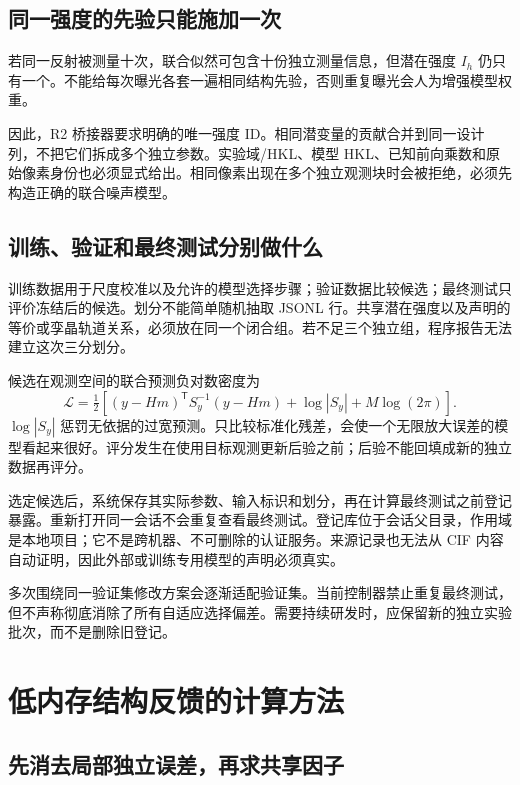 \documentclass[UTF8,11pt,a4paper,fontset=fandol]{ctexart}
\newcommand{\T}{^{\mathsf T}}
\begin{document}
\subsection{同一强度的先验只能施加一次}

若同一反射被测量十次，联合似然可包含十份独立测量信息，但潜在强度 $I_h$ 仍只有一个。不能给每次曝光各套一遍相同结构先验，否则重复曝光会人为增强模型权重。

因此，R2 桥接器要求明确的唯一强度 ID。相同潜变量的贡献合并到同一设计列，不把它们拆成多个独立参数。实验域/HKL、模型 HKL、已知前向乘数和原始像素身份也必须显式给出。相同像素出现在多个独立观测块时会被拒绝，必须先构造正确的联合噪声模型。

\subsection{训练、验证和最终测试分别做什么}

训练数据用于尺度校准以及允许的模型选择步骤；验证数据比较候选；最终测试只评价冻结后的候选。划分不能简单随机抽取 JSONL 行。共享潜在强度以及声明的等价或孪晶轨道关系，必须放在同一个闭合组。若不足三个独立组，程序报告无法建立这次三分划分。

候选在观测空间的联合预测负对数密度为
\begin{equation}
 \mathcal L=\tfrac12\left[(y-Hm)\T S_y^{-1}(y-Hm)
 +\log|S_y|+M\log(2\pi)\right].
\end{equation}
$\log|S_y|$ 惩罚无依据的过宽预测。只比较标准化残差，会使一个无限放大误差的模型看起来很好。评分发生在使用目标观测更新后验之前；后验不能回填成新的独立数据再评分。

选定候选后，系统保存其实际参数、输入标识和划分，再在计算最终测试之前登记暴露。重新打开同一会话不会重复查看最终测试。登记库位于会话父目录，作用域是本地项目；它不是跨机器、不可删除的认证服务。来源记录也无法从 CIF 内容自动证明，因此外部或训练专用模型的声明必须真实。

多次围绕同一验证集修改方案会逐渐适配验证集。当前控制器禁止重复最终测试，但不声称彻底消除了所有自适应选择偏差。需要持续研发时，应保留新的独立实验批次，而不是删除旧登记。

\section{低内存结构反馈的计算方法}
\subsection{先消去局部独立误差，再求共享因子}
\end{document}
